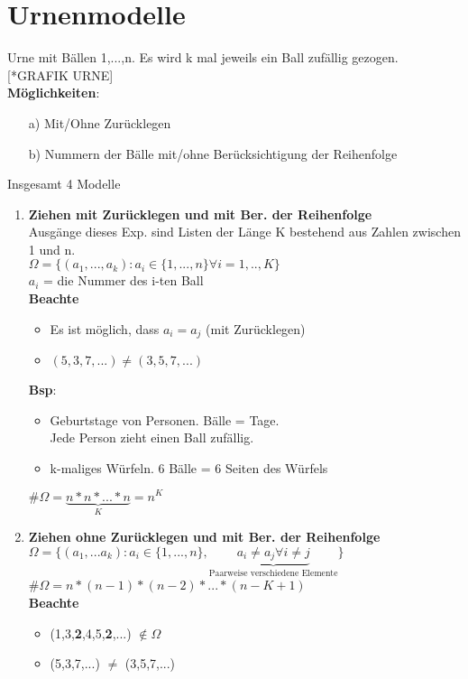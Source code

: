 \section{Urnenmodelle}
Urne mit Bällen 1,...,n. Es wird k mal jeweils ein Ball zufällig gezogen. [*GRAFIK URNE]\\
\textbf{Möglichkeiten}:
\begin{enumerate}
	\item[a)] Mit/Ohne Zurücklegen
	\item[b)] Nummern der Bälle mit/ohne Berücksichtigung der Reihenfolge
\end{enumerate}
Insgesamt 4 Modelle
\begin{enumerate}
	\item \textbf{Ziehen mit Zurücklegen und mit Ber. der Reihenfolge}\\
	Ausgänge dieses Exp. sind Listen der Länge K bestehend aus Zahlen zwischen 1 und n.\\
	$\Omega=\{(a_1,...,a_k):a_i \in \{1,...,n\} \forall i = 1,..,K\}$\\
	$a_i$ = die Nummer des i-ten Ball\smallskip\\
	\textbf{Beachte}
\begin{itemize}
	\item 	Es ist möglich, dass $a_i = a_j$ (mit Zurücklegen)
	\item 	$(5,3,7,...) \neq (3,5,7,...)$
\end{itemize}
	\textbf{Bsp}:
	\begin{itemize}
		\item Geburtstage von Personen. Bälle = Tage. \\Jede Person zieht einen Ball zufällig.
		\item k-maliges Würfeln. 6 Bälle = 6 Seiten des Würfels\\
	\end{itemize}
$\#\Omega = \underbrace{n * n * ... * n}_K = n^K$
	\item \textbf{Ziehen ohne Zurücklegen und mit Ber. der Reihenfolge}\\
	$\Omega=\{(a_1,...a_k):a_i \in \{1,...,n\},\underbrace{a_i \neq a_j\forall i\neq j}_\text{Paarweise verschiedene Elemente} \}$\smallskip\\
	\#$\Omega = n* (n-1)*(n-2)*...*(n-K+1)$\smallskip\\
	\textbf{Beachte}
	\begin{itemize}
		\item (1,3,\textbf{2},4,5,\textbf{2},...) $\notin \Omega$
		\item (5,3,7,...) $\neq$ (3,5,7,...)

\end{itemize}
\end{enumerate}
